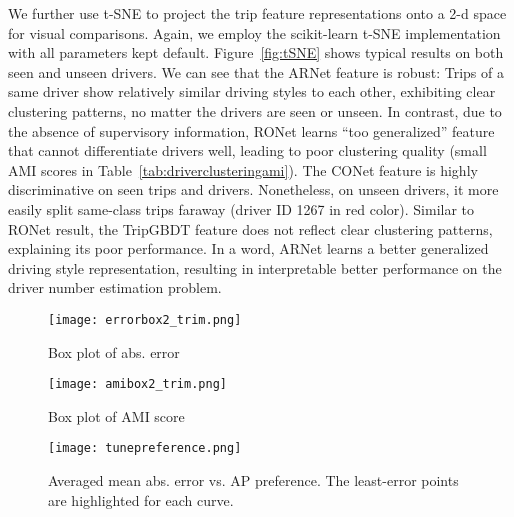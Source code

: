 \documentclass{article}
\begin{document}
We further use t-SNE \cite{maaten2008visualizing} to project the trip feature representations onto a 2-d space for visual comparisons.
Again, we employ the scikit-learn \cite{scikit-learn} t-SNE implementation with all parameters kept default.
Figure~\ref{fig:tSNE} shows typical results on both seen and unseen drivers.
We can see that the ARNet feature is robust: Trips of a same driver show relatively similar driving styles to each other, exhibiting clear clustering patterns, no matter the drivers are seen or unseen.
In contrast, due to the absence of supervisory information, RONet learns ``too generalized'' feature that cannot differentiate drivers well, leading to poor clustering quality (small AMI scores in Table~\ref{tab:driverclusteringami}).
The CONet feature is highly discriminative on seen trips and drivers. Nonetheless, on unseen drivers, it more easily split same-class trips faraway (driver ID 1267 in red color).
Similar to RONet result, the TripGBDT feature does not reflect clear clustering patterns, explaining its poor performance.
In a word, ARNet learns a better generalized driving style representation, %
resulting in interpretable better performance on the driver number estimation problem.


\begin{figure}[t]
\centering
\texttt{[image: errorbox2\_trim.png]}
\vspace{-0.28in}
\caption{Box plot of abs. error}
\label{fig:errboxplot}
\vspace{0.11in}
\texttt{[image: amibox2\_trim.png]}
\vspace{-0.28in}
\caption{Box plot of AMI score}
\label{fig:amiboxplot}
\vspace{-0.15in}
\end{figure}





\begin{figure}[t]
\centering
\texttt{[image: tunepreference.png]}
\vspace{-0.15in}
\caption{Averaged mean abs. error vs. AP preference. The least-error points are highlighted for each curve.}
\label{fig:tunepreference}
\vspace{-0.15in}
\end{figure}
\end{document}
